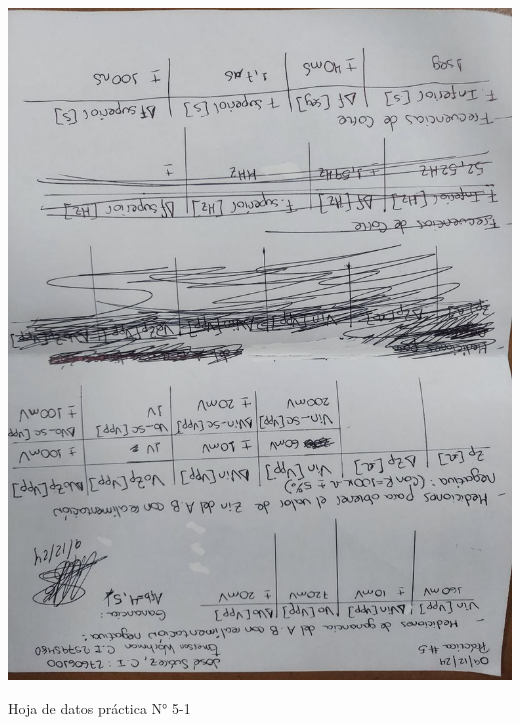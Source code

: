 \begin{ilustracion}[ht]
    \centering
    \includegraphics[width=1.0\textwidth, angle=90]{src/images/p5/p5-hoja-de-datos-1.jpg}
    \caption{Hoja de datos práctica N° 5-1}
    \label{ilus:hoja-de-datos-p5-1}
\end{ilustracion}

